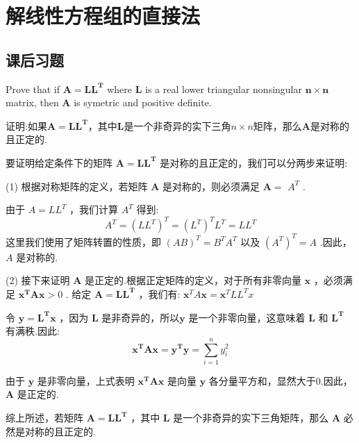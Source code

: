 \newpage
\section{解线性方程组的直接法}
\subsection{课后习题}
\begin{tcolorbox}[breakable,enhanced,arc=0mm,outer arc=0mm,
		boxrule=0pt,toprule=1pt,leftrule=0pt,bottomrule=1pt, rightrule=0pt,left=0.2cm,right=0.2cm,
		titlerule=0.5em,toptitle=0.1cm,bottomtitle=-0.1cm,top=0.2cm,
		colframe=white!10!biru,colback=white!90!biru,coltitle=white,
            coltext=black,title =2024-04-02, title style={white!10!biru}, before skip=8pt, after skip=8pt,before upper=\hspace{2em},
		fonttitle=\bfseries,fontupper=\normalsize]
  
Prove that if $ \boldsymbol{A}=\boldsymbol{L L}^{\boldsymbol{T}} $ where $ \boldsymbol{L} $ is a real lower triangular nonsingular $ \boldsymbol{n} \times \boldsymbol{n} $ matrix, then $ \boldsymbol{A} $ is symetric and positive definite.

证明:如果$ \boldsymbol{A}=\boldsymbol{L L}^{\boldsymbol{T}} $，其中$ \boldsymbol{L} $是一个非奇异的实下三角$ n \times n $矩阵，那么$ \boldsymbol{A} $是对称的且正定的.
 \tcblower

要证明给定条件下的矩阵 $ \boldsymbol{A}=\boldsymbol{L} \boldsymbol{L}^{\boldsymbol{T}} $ 是对称的且正定的，我们可以分两步来证明:

(1) 根据对称矩阵的定义，若矩阵 $ \boldsymbol{A} $ 是对称的，则必须满足 $ \boldsymbol{A}= $ $ A^{T} $ .

由于 $ A=L L^{T} $ ，我们计算 $ A^{T} $ 得到:
$$
A^{T}=\left(L L^{T}\right)^{T}=\left(L^{T}\right)^{T} L^{T}=L L^{T}
$$
这里我们使用了矩阵转置的性质，即 $ (A B)^{T}=B^{T} A^{T} $ 以及 $ \left(A^{T}\right)^{T}=A $ .因此， $ A $ 是对称的.

(2) 接下来证明 $ \boldsymbol{A} $ 是正定的.根据正定矩阵的定义，对于所有非零向量 $ \boldsymbol{x} $ ，必须满足 $ \boldsymbol{x}^{\boldsymbol{T}} \boldsymbol{A x}>0 $ .
给定 $ \boldsymbol{A}=\boldsymbol{L} \boldsymbol{L}^{\boldsymbol{T}} $ ，我们有:
$ \boldsymbol{x}^{T} A \boldsymbol{x}=\boldsymbol{x}^{T} L L^{T} x $

令 $ \boldsymbol{y}=\boldsymbol{L}^{\boldsymbol{T}} \boldsymbol{x} $ ，因为 $ \boldsymbol{L} $ 是非奇异的，所以$\boldsymbol{y} $ 是一个非零向量，这意味着 $ \boldsymbol{L} $ 和 $ \boldsymbol{L}^{\boldsymbol{T}} $ 有满秩.因此:
$$
\boldsymbol{x}^{\boldsymbol{T}} \boldsymbol{A} \boldsymbol{x}=\boldsymbol{y}^{\boldsymbol{T}} \boldsymbol{y}=\sum_{i=1}^{n} y_{i}^{2}
$$

由于 $ \boldsymbol{y} $ 是非零向量，上式表明 $ \boldsymbol{x}^{\boldsymbol{T}} \boldsymbol{A} \boldsymbol{x} $ 是向量 $ \boldsymbol{y} $ 各分量平方和，显然大于0.因此， $ \boldsymbol{A} $ 是正定的.

综上所述，若矩阵 $ \boldsymbol{A}=\boldsymbol{L} \boldsymbol{L}^{\boldsymbol{T}} $ ，其中 $ \boldsymbol{L} $ 是一个非奇异的实下三角矩阵，那么 $ \boldsymbol{A} $ 必然是对称的且正定的.
\end{tcolorbox}




